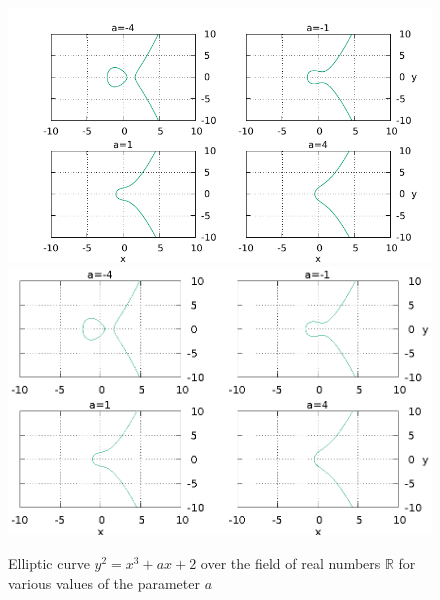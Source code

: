 \begin{figure}
\centering
\ifpdf
\includegraphics[angle=0]
{./add/discretmath/picelliptic.pdf}
\else
\includegraphics[angle=0]
{./add/discretmath/picelliptic.eps}
\fi
\caption{Elliptic curve $y^2 = x^3 + a x + 2$ over the field
  of real numbers $\mathbb{R}$ for various values of the parameter $a$}
\label{fig:add:ellipticR}
\end{figure}